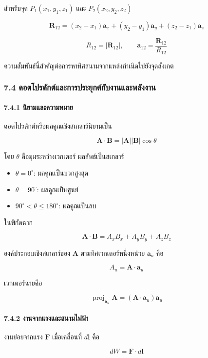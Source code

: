 สำหรับจุด \(P_1(x_1,y_1,z_1)\) และ \(P_2(x_2,y_2,z_2)\)

\[
\mathbf{R}_{12}=(x_2-x_1)\mathbf{a}_x+(y_2-y_1)\mathbf{a}_y+(z_2-z_1)\mathbf{a}_z
\]

\[
R_{12}=|\mathbf{R}_{12}|,\qquad
\mathbf{a}_{12}=\frac{\mathbf{R}_{12}}{R_{12}}
\]

ความสัมพันธ์นี้สำคัญต่อการหาทิศสนามจากแหล่งกำเนิดไปยังจุดสังเกต

\subsubsection{7.4 ดอตโปรดักต์และการประยุกต์กับงานและพลังงาน}

\paragraph{7.4.1 นิยามและความหมาย}

ดอตโปรดักต์หรือผลคูณเชิงสเกลาร์นิยามเป็น

\[
\mathbf{A}\cdot\mathbf{B}=|\mathbf{A}||\mathbf{B}|\cos\theta
\]

โดย \(\theta\) คือมุมระหว่างเวกเตอร์ ผลลัพธ์เป็นสเกลาร์

\begin{itemize}
\item \(\theta=0^\circ\): ผลคูณเป็นบวกสูงสุด
\item \(\theta=90^\circ\): ผลคูณเป็นศูนย์
\item \(90^\circ<\theta\leq180^\circ\): ผลคูณเป็นลบ
\end{itemize}

ในพิกัดฉาก

\[
\mathbf{A}\cdot\mathbf{B}=A_xB_x+A_yB_y+A_zB_z
\]

องค์ประกอบเชิงสเกลาร์ของ \(\mathbf{A}\) ตามทิศเวกเตอร์หนึ่งหน่วย \(\mathbf{a}_u\) คือ

\[
A_u=\mathbf{A}\cdot\mathbf{a}_u
\]

เวกเตอร์ฉายคือ

\[
\operatorname{proj}_{\mathbf{a}_u}\mathbf{A}
=(\mathbf{A}\cdot\mathbf{a}_u)\mathbf{a}_u
\]

\paragraph{7.4.2 งานจากแรงและสนามไฟฟ้า}

งานย่อยจากแรง \(\mathbf{F}\) เมื่อเคลื่อนที่ \(d\mathbf{l}\) คือ

\[
dW=\mathbf{F}\cdot d\mathbf{l}
\]

